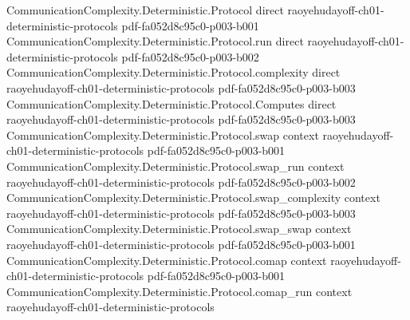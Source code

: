 \begin{theorem}
\label{CommunicationComplexity.Functions.Equality.le_communicationComplexity}
\leanok
{}
\proofstep
  {CommunicationComplexity.Deterministic.Protocol}
  {direct}
  {raoyehudayoff-ch01-deterministic-protocols}
  {pdf-fa052d8c95c0-p003-b001}
\proofstep
  {CommunicationComplexity.Deterministic.Protocol.run}
  {direct}
  {raoyehudayoff-ch01-deterministic-protocols}
  {pdf-fa052d8c95c0-p003-b002}
\proofstep
  {CommunicationComplexity.Deterministic.Protocol.complexity}
  {direct}
  {raoyehudayoff-ch01-deterministic-protocols}
  {pdf-fa052d8c95c0-p003-b003}
\proofstep
  {CommunicationComplexity.Deterministic.Protocol.Computes}
  {direct}
  {raoyehudayoff-ch01-deterministic-protocols}
  {pdf-fa052d8c95c0-p003-b003}
\proofstep
  {CommunicationComplexity.Deterministic.Protocol.swap}
  {context}
  {raoyehudayoff-ch01-deterministic-protocols}
  {pdf-fa052d8c95c0-p003-b001}
\proofstep
  {CommunicationComplexity.Deterministic.Protocol.swap_run}
  {context}
  {raoyehudayoff-ch01-deterministic-protocols}
  {pdf-fa052d8c95c0-p003-b002}
\proofstep
  {CommunicationComplexity.Deterministic.Protocol.swap_complexity}
  {context}
  {raoyehudayoff-ch01-deterministic-protocols}
  {pdf-fa052d8c95c0-p003-b003}
\proofstep
  {CommunicationComplexity.Deterministic.Protocol.swap_swap}
  {context}
  {raoyehudayoff-ch01-deterministic-protocols}
  {pdf-fa052d8c95c0-p003-b001}
\proofstep
  {CommunicationComplexity.Deterministic.Protocol.comap}
  {context}
  {raoyehudayoff-ch01-deterministic-protocols}
  {pdf-fa052d8c95c0-p003-b001}
\proofstep
  {CommunicationComplexity.Deterministic.Protocol.comap_run}
  {context}
  {raoyehudayoff-ch01-deterministic-protocols}

\end{theorem}
